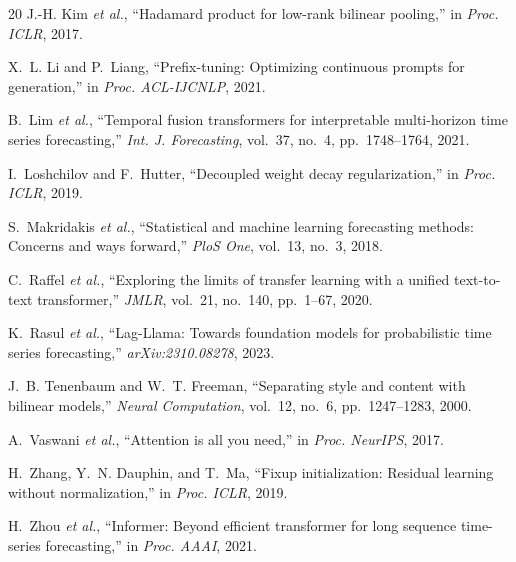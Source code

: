 \documentclass[10pt,conference]{IEEEtran}
\begin{document}
\begin{thebibliography}{20}
J.-H. Kim \emph{et al.}, ``Hadamard product for low-rank bilinear pooling,'' in \emph{Proc. ICLR}, 2017.

X.~L. Li and P.~Liang, ``Prefix-tuning: Optimizing continuous prompts for generation,'' in \emph{Proc. ACL-IJCNLP}, 2021.

B.~Lim \emph{et al.}, ``Temporal fusion transformers for interpretable multi-horizon time series forecasting,'' \emph{Int. J. Forecasting}, vol.~37, no.~4, pp.~1748--1764, 2021.

I.~Loshchilov and F.~Hutter, ``Decoupled weight decay regularization,'' in \emph{Proc. ICLR}, 2019.

S.~Makridakis \emph{et al.}, ``Statistical and machine learning forecasting methods: Concerns and ways forward,'' \emph{PloS One}, vol.~13, no.~3, 2018.

C.~Raffel \emph{et al.}, ``Exploring the limits of transfer learning with a unified text-to-text transformer,'' \emph{JMLR}, vol.~21, no.~140, pp.~1--67, 2020.

K.~Rasul \emph{et al.}, ``Lag-Llama: Towards foundation models for probabilistic time series forecasting,'' \emph{arXiv:2310.08278}, 2023.

J.~B. Tenenbaum and W.~T. Freeman, ``Separating style and content with bilinear models,'' \emph{Neural Computation}, vol.~12, no.~6, pp.~1247--1283, 2000.

A.~Vaswani \emph{et al.}, ``Attention is all you need,'' in \emph{Proc. NeurIPS}, 2017.

H.~Zhang, Y.~N. Dauphin, and T.~Ma, ``Fixup initialization: Residual learning without normalization,'' in \emph{Proc. ICLR}, 2019.

H.~Zhou \emph{et al.}, ``Informer: Beyond efficient transformer for long sequence time-series forecasting,'' in \emph{Proc. AAAI}, 2021.

\end{thebibliography}
\end{document}
